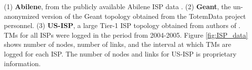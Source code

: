 %
%
%
%
%


(1) \textbf{Abilene}, from the publicly available Abilene ISP data \cite{abilene}.
(2) \textbf{Geant}, the un-anonymized version of the Geant topology obtained from the TotemData \cite{TotemData} project personnel. 
(3) \textbf{US-ISP}, a large Tier-1 ISP topology obtained from authors of  \cite{MultiTM}.  TMs for all ISPs were logged in the period from 2004-2005. Figure \ref{fig:ISP_data} shows number of nodes, number of links, and the interval at which TMs are logged for each ISP.  The number of nodes and links for US-ISP is proprietary information.


%
%
%
%

